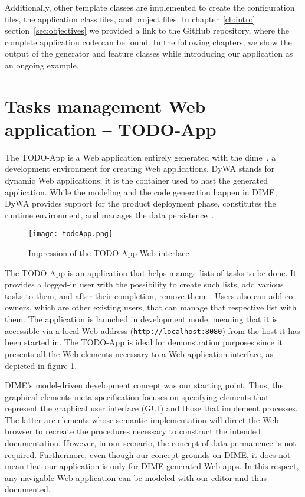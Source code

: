 Additionally, other template classes are implemented to create the configuration files, the application class files, and project files. In chapter~\ref{ch:intro} section~\ref{sec:objectives} we provided a link to the GitHub repository, where the complete application code can be found. In the following chapters, we show the output of the generator and feature classes while introducing our application as an ongoing example.

\section{Tasks management Web application -- TODO-App}\label{sec:todoApp}

The TODO-App is a Web application entirely generated with the \gls{dime}~\cite{bosselmann-et_al}, a development environment for creating Web applications. DyWA stands for dynamic Web applications; it is the container used to host the generated application. While the modeling and the code generation happen in DIME, DyWA provides support for the product deployment phase, constitutes the runtime environment, and manages the data persistence~\cite{bosselmann-et_al}.

\begin{figure}[h]
    \centering
    \texttt{[image: todoApp.png]}
    \caption{Impression of the TODO-App Web interface}
    \label{fig:todoApp}
\end{figure}

The TODO-App is an application that helps manage lists of tasks to be done. It provides a logged-in user with the possibility to create such lists, add various tasks to them, and after their completion, remove them~\cite{bosselmann-et_al}. Users also can add co-owners, which are other existing users, that can manage that respective list with them. The application is launched in development mode, meaning that it is accessible via a local Web address (\lstinline{http://localhost:8080}) from the host it has been started in. The TODO-App is ideal for demonstration purposes since it presents all the Web elements necessary to a Web application interface, as depicted in figure \ref{fig:todoApp}.

DIME's model-driven development concept was our starting point. Thus, the graphical elements meta specification focuses on specifying elements that represent the graphical user interface (GUI) and those that implement processes. The latter are elements whose semantic implementation will direct the Web browser to recreate the procedures necessary to construct the intended documentation. However, in our scenario, the concept of data permanence is not required. Furthermore, even though our concept grounds on DIME, it does not mean that our application is only for DIME-generated Web apps. In this respect, any navigable Web application can be modeled with our editor and thus documented.